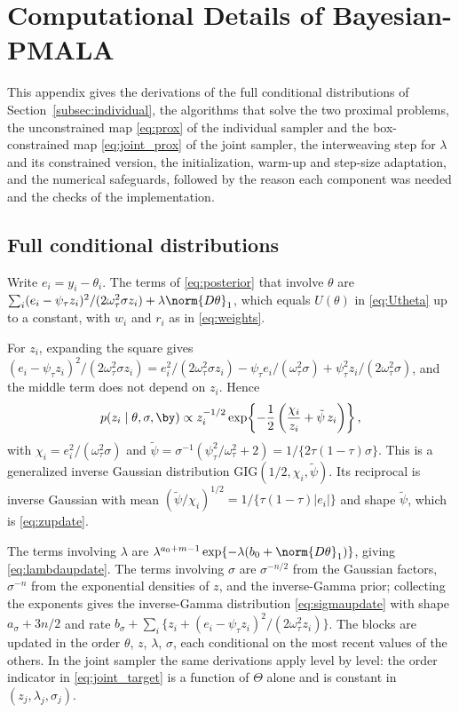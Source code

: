 \section{Computational Details of Bayesian-PMALA}
\label{app:pmala}

This appendix gives the derivations of the full conditional distributions of Section~\ref{subsec:individual}, the algorithms that solve the two proximal problems, the unconstrained map \eqref{eq:prox} of the individual sampler and the box-constrained map \eqref{eq:joint_prox} of the joint sampler, the interweaving step for $\lambda$ and its constrained version, the initialization, warm-up and step-size adaptation, and the numerical safeguards, followed by the reason each component was needed and the checks of the implementation.

\subsection{Full conditional distributions}
\label{app:pmala:conditionals}

Write $e_i = y_i - \theta_i$. The terms of \eqref{eq:posterior} that involve $\theta$ are $\sum_i (e_i - \psi_\tau z_i)^2/(2\omega_\tau^2\sigma z_i) + \lambda\norm{D\theta}_1$, which equals $U(\theta)$ in \eqref{eq:Utheta} up to a constant, with $w_i$ and $r_i$ as in \eqref{eq:weights}.

For $z_i$, expanding the square gives $(e_i - \psi_\tau z_i)^2/(2\omega_\tau^2\sigma z_i) = e_i^2/(2\omega_\tau^2\sigma z_i) - \psi_\tau e_i/(\omega_\tau^2\sigma) + \psi_\tau^2 z_i/(2\omega_\tau^2\sigma)$, and the middle term does not depend on $z_i$. Hence
\[
p(z_i \mid \theta, \sigma, \by) \propto z_i^{-1/2} \exp\!\left\{-\frac{1}{2}\left(\frac{\chi_i}{z_i} + \tilde\psi\, z_i\right)\right\},
\]
with $\chi_i = e_i^2/(\omega_\tau^2 \sigma)$ and $\tilde\psi = \sigma^{-1}(\psi_\tau^2/\omega_\tau^2 + 2) = 1/\{2\tau(1-\tau)\sigma\}$. This is a generalized inverse Gaussian distribution $\mathrm{GIG}(1/2, \chi_i, \tilde\psi)$. Its reciprocal is inverse Gaussian with mean $(\tilde\psi/\chi_i)^{1/2} = 1/\{\tau(1-\tau)|e_i|\}$ and shape $\tilde\psi$, which is \eqref{eq:zupdate}.

The terms involving $\lambda$ are $\lambda^{a_0+m-1}\exp\{-\lambda(b_0 + \norm{D\theta}_1)\}$, giving \eqref{eq:lambdaupdate}. The terms involving $\sigma$ are $\sigma^{-n/2}$ from the Gaussian factors, $\sigma^{-n}$ from the exponential densities of $z$, and the inverse-Gamma prior; collecting the exponents gives the inverse-Gamma distribution \eqref{eq:sigmaupdate} with shape $a_\sigma + 3n/2$ and rate $b_\sigma + \sum_i\{z_i + (e_i - \psi_\tau z_i)^2/(2\omega_\tau^2 z_i)\}$. The blocks are updated in the order $\theta$, $z$, $\lambda$, $\sigma$, each conditional on the most recent values of the others. In the joint sampler the same derivations apply level by level: the order indicator in \eqref{eq:joint_target} is a function of $\Theta$ alone and is constant in $(z_j, \lambda_j, \sigma_j)$.

